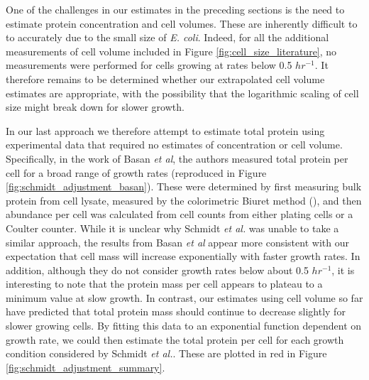 One of the challenges in our estimates in the preceding  sections is the need to estimate protein
concentration and cell volumes. These are inherently difficult to to accurately due to the small size of \textit{E. coli}. Indeed, for
all the additional measurements of cell volume included in Figure \ref{fig:cell_size_literature},
no measurements were performed for cells growing at rates below 0.5 $hr^{-1}$. It therefore remains
to be determined whether our extrapolated cell volume estimates are appropriate, with the
possibility that the logarithmic scaling of cell size might break down for slower growth.

In our last approach we therefore attempt to estimate total protein
using experimental data that required  no estimates of concentration or cell
volume. Specifically, in the work of  Basan \textit{et al}, the authors measured total protein
per cell for a broad range of growth rates (reproduced in Figure \ref{fig:schmidt_adjustment_basan}).
These were determined
by first measuring bulk protein from cell lysate, measured by the colorimetric Biuret method (\cite{You2013}), and then abundance per cell was calculated from cell counts from either plating cells or a Coulter counter. While it is
unclear why Schmidt \textit{et al.} was unable to take a similar approach, the
results from Basan \textit{et al} appear more consistent with our expectation that cell mass will  increase
exponentially with faster growth rates. In addition, although they do not consider growth rates below
about 0.5 $hr^{-1}$, it is interesting to note that the protein mass per cell appears to plateau to a minimum value at slow growth. In contrast, our estimates using cell volume so far have predicted that total protein mass should continue to decrease slightly for slower growing cells.
By fitting this data to an exponential function dependent on growth rate, we could then estimate the
total protein per cell for each growth condition considered by Schmidt \textit{et al.}.
These are plotted in red in Figure \ref{fig:schmidt_adjustment_summary}.


